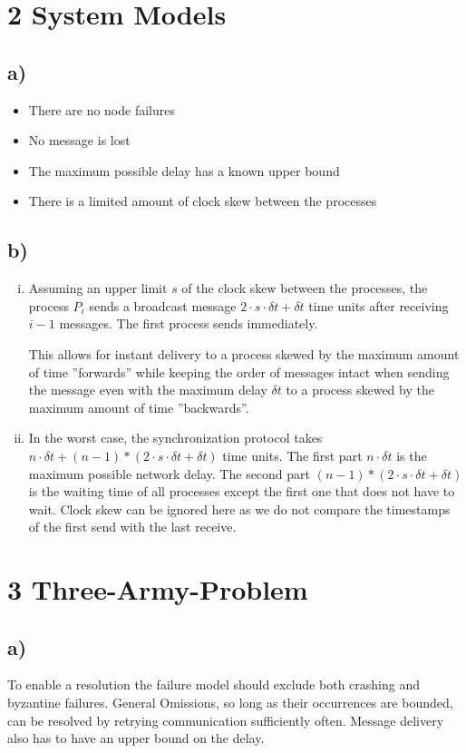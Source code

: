 \documentclass{scrartcl}
\begin{document}
\section*{2 System Models}
\subsection*{a)}
\begin{itemize}
	\item There are no node failures
	\item No message is lost
	\item The maximum possible delay has a known upper bound
	\item There is a limited amount of clock skew between the processes
\end{itemize}
\subsection*{b)}
\begin{enumerate}[i.]
	\item Assuming an upper limit \(s\) of the clock skew between the processes, the process \(P_i\) sends a broadcast message \(2 \cdot s \cdot \delta t + \delta t\) time units after receiving \(i - 1\) messages.
		The first process sends immediately.

		This allows for instant delivery to a process skewed by the maximum amount of time ''forwards'' while keeping the order of messages intact when sending the message even with the maximum delay \(\delta t\) to a process skewed by the maximum amount of time ''backwards''.
	\item In the worst case, the synchronization protocol takes \(n \cdot \delta t + (n-1)*(2 \cdot s \cdot \delta t + \delta t)\) time units.
		The first part \(n \cdot \delta t\) is the maximum possible network delay.
		The second part \((n-1)*(2 \cdot s \cdot \delta t + \delta t)\) is the waiting time of all processes except the first one that does not have to wait.
		Clock skew can be ignored here as we do not compare the timestamps of the first send with the last receive.
\end{enumerate}

\pagebreak

\section*{3 Three-Army-Problem}
\subsection*{a)}
To enable a resolution the failure model should exclude both crashing and byzantine failures.
General Omissions, so long as their occurrences are bounded, can be resolved by retrying communication sufficiently often.
Message delivery also has to have an upper bound on the delay.
\end{document}
